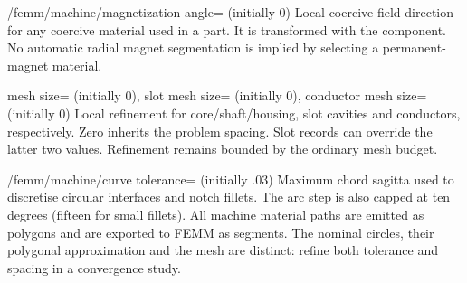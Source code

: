 \begin{key}{/femm/machine/magnetization angle= (initially 0)}
Local coercive-field direction for any coercive material used in a part.
It is transformed with the component. No automatic radial magnet segmentation
is implied by selecting a permanent-magnet material.
\end{key}
\begin{keylist}{mesh size= (initially 0),
 slot mesh size= (initially 0),
 conductor mesh size= (initially 0)}
Local refinement for core/shaft/housing, slot cavities and conductors,
respectively. Zero inherits the problem spacing. Slot records can override
the latter two values. Refinement remains bounded by the ordinary mesh budget.
\end{keylist}
\begin{key}{/femm/machine/curve tolerance= (initially .03)}
Maximum chord sagitta used to discretise circular interfaces and notch fillets.
The arc step is also capped at ten degrees (fifteen for small fillets).
All machine material paths are emitted as polygons and are exported to FEMM
as segments. The nominal circles, their polygonal approximation and the mesh
are distinct: refine both tolerance and spacing in a convergence study.
\end{key}

